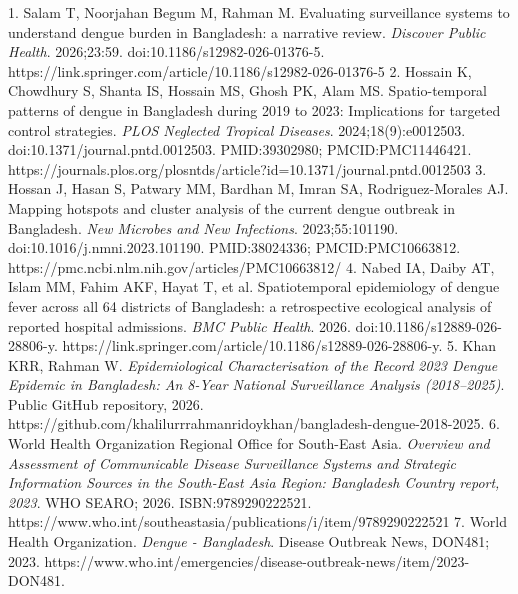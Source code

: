1. Salam T, Noorjahan Begum M, Rahman M. Evaluating surveillance systems to understand dengue burden in Bangladesh: a narrative review. \emph{Discover Public Health}. 2026;23:59. doi:10.1186/s12982-026-01376-5. https://link.springer.com/article/10.1186/s12982-026-01376-5 2. Hossain K, Chowdhury S, Shanta IS, Hossain MS, Ghosh PK, Alam MS. Spatio-temporal patterns of dengue in Bangladesh during 2019 to 2023: Implications for targeted control strategies. \emph{PLOS Neglected Tropical Diseases}. 2024;18(9):e0012503. doi:10.1371/journal.pntd.0012503. PMID:39302980; PMCID:PMC11446421. https://journals.plos.org/plosntds/article?id=10.1371/journal.pntd.0012503 3. Hossan J, Hasan S, Patwary MM, Bardhan M, Imran SA, Rodriguez-Morales AJ. Mapping hotspots and cluster analysis of the current dengue outbreak in Bangladesh. \emph{New Microbes and New Infections}. 2023;55:101190. doi:10.1016/j.nmni.2023.101190. PMID:38024336; PMCID:PMC10663812. https://pmc.ncbi.nlm.nih.gov/articles/PMC10663812/ 4. Nabed IA, Daiby AT, Islam MM, Fahim AKF, Hayat T, et al. Spatiotemporal epidemiology of dengue fever across all 64 districts of Bangladesh: a retrospective ecological analysis of reported hospital admissions. \emph{BMC Public Health}. 2026. doi:10.1186/s12889-026-28806-y. https://link.springer.com/article/10.1186/s12889-026-28806-y. 5. Khan KRR, Rahman W. \emph{Epidemiological Characterisation of the Record 2023 Dengue Epidemic in Bangladesh: An 8-Year National Surveillance Analysis (2018--2025)}. Public GitHub repository, 2026. https://github.com/khalilurrrahmanridoykhan/bangladesh-dengue-2018-2025. 6. World Health Organization Regional Office for South-East Asia. \emph{Overview and Assessment of Communicable Disease Surveillance Systems and Strategic Information Sources in the South-East Asia Region: Bangladesh Country report, 2023}. WHO SEARO; 2026. ISBN:9789290222521. https://www.who.int/southeastasia/publications/i/item/9789290222521 7. World Health Organization. \emph{Dengue - Bangladesh}. Disease Outbreak News, DON481; 2023. https://www.who.int/emergencies/disease-outbreak-news/item/2023-DON481.
